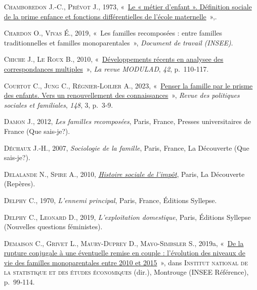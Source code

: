 \documentclass[
  12pt,
]{book}
\newlength{\cslhangindent}
\newenvironment{CSLReferences}[2] %
 {\begin{list}{}{%
  \setlength{\itemindent}{0pt}
  \setlength{\leftmargin}{0pt}
  \setlength{\parsep}{0pt}
  \ifodd #1
   \setlength{\leftmargin}{\cslhangindent}
   \setlength{\itemindent}{-1\cslhangindent}
  \fi
  \setlength{\itemsep}{#2\baselineskip}}}
 {\end{list}}
\begin{document}
\begin{CSLReferences}{0}{1}
\textsc{Chamboredon J.-C.}, \textsc{Prévot J.}, 1973,
{«~\href{https://doi.org/10.2307/3320469}{Le « métier d'enfant ».
Définition sociale de la prime enfance et fonctions différentielles de
l'école maternelle}~»},.

\textsc{Chardon O.}, \textsc{Vivas É.}, 2019, {«~Les familles
recomposées : entre familles traditionnelles et familles
monoparentales~»}, \emph{Document de travail (INSEE)}.

\textsc{Chiche J.}, \textsc{Le Roux B.}, 2010,
{«~\href{https://hal.science/hal-00625921}{Développements récents en
analysee des correspondances multiples}~»}, \emph{La revue MODULAD},
\emph{42}, p.~110‑117.

\textsc{Courtot C.}, \textsc{Jung C.}, \textsc{Régnier-Loilier A.},
2023, {«~\href{https://doi.org/10.3917/rpsf.148.0003}{Penser la famille
par le prisme des enfants. Vers un renouvellement des connaissances}~»},
\emph{Revue des politiques sociales et familiales}, \emph{148}, 3,
p.~3‑9.

\textsc{Damon J.}, 2012, \emph{Les familles recomposées}, Paris, France,
Presses universitaires de France (Que sais-je?).

\textsc{Déchaux J.-H.}, 2007, \emph{Sociologie de la famille}, Paris,
France, La Découverte (Que sais-je?).

\textsc{Delalande N.}, \textsc{Spire A.}, 2010,
\emph{\href{https://www.cairn.info/histoire-sociale-de-l-impot--9782707157164.htm}{Histoire
sociale de l{'}impôt}}, Paris, La Découverte (Repères).

\textsc{Delphy C.}, 1970, \emph{L'ennemi principal}, Paris, France,
Éditions Syllepse.

\textsc{Delphy C.}, \textsc{Leonard D.}, 2019, \emph{L'exploitation
domestique}, Paris, Éditions Syllepse (Nouvelles questions féministes).

\textsc{Demaison C.}, \textsc{Grivet L.}, \textsc{Maury-Duprey D.},
\textsc{Mayo-Simbsler S.}, 2019a,
{«~\href{https://www.insee.fr/fr/statistiques/4238781}{De la rupture
conjugale à une éventuelle remise en couple : l{'}évolution des niveaux
de vie des familles monoparentales entre 2010 et 2015}~»}, dans
\textsc{Institut national de la statistique et des études économiques}
(dir.), Montrouge (INSEE Référence), p.~99‑114.


\end{CSLReferences}
\end{document}
